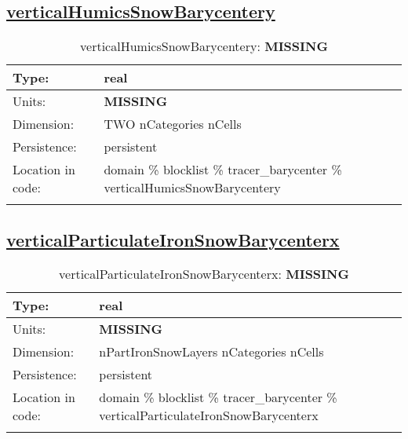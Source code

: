 \subsection[verticalHumicsSnowBarycentery]{\hyperref[sec:var_tab_tracer_barycenter]{verticalHumicsSnowBarycentery}}
\label{subsec:var_sec_tracer_barycenter_verticalHumicsSnowBarycentery}
\begin{center}
\begin{longtable}{| p{2.0in} | p{4.0in} |}
        \hline 
        Type: & real \\
        \hline 
        Units: & {\bf \color{red} MISSING} \\
        \hline 
        Dimension: & TWO nCategories nCells \\
        \hline 
        Persistence: & persistent \\
        \hline 
         Location in code: & domain \% blocklist \% tracer\_barycenter \% verticalHumicsSnowBarycentery \\
         \hline 
    \caption{verticalHumicsSnowBarycentery: {\bf \color{red} MISSING}}
\end{longtable}
\end{center}
\subsection[verticalParticulateIronSnowBarycenterx]{\hyperref[sec:var_tab_tracer_barycenter]{verticalParticulateIronSnowBarycenterx}}
\label{subsec:var_sec_tracer_barycenter_verticalParticulateIronSnowBarycenterx}
\begin{center}
\begin{longtable}{| p{2.0in} | p{4.0in} |}
        \hline 
        Type: & real \\
        \hline 
        Units: & {\bf \color{red} MISSING} \\
        \hline 
        Dimension: & nPartIronSnowLayers nCategories nCells \\
        \hline 
        Persistence: & persistent \\
        \hline 
         Location in code: & domain \% blocklist \% tracer\_barycenter \% verticalParticulateIronSnowBarycenterx \\
         \hline 
    \caption{verticalParticulateIronSnowBarycenterx: {\bf \color{red} MISSING}}
\end{longtable}
\end{center}
